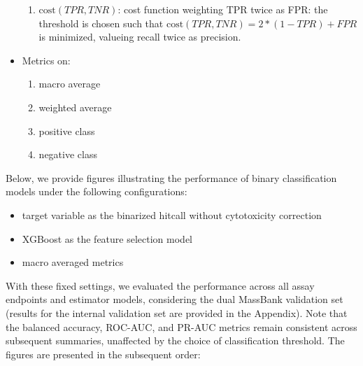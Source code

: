 \begin{itemize}
\begin{enumerate}
      \item $\text{cost}(TPR, TNR)$: cost function weighting TPR twice as FPR: the threshold is chosen such that $\text{cost}(TPR, TNR) = 2 * (1 - TPR) + FPR$ is minimized, valueing recall twice as precision.
    \end{enumerate}
  \item Metrics on:
    \begin{enumerate}
      \item macro average
      \item weighted average
      \item positive class
      \item negative class
    \end{enumerate}
\end{itemize}


Below, we provide figures illustrating the performance of binary classification models under the following configurations:
\begin{itemize}
  \item target variable as the binarized hitcall without cytotoxicity correction
  \item XGBoost as the feature selection model
  \item macro averaged metrics
\end{itemize}

With these fixed settings, we evaluated the performance across all assay endpoints and estimator models, considering the dual MassBank validation set (results for the internal validation set are provided in the Appendix). Note that the balanced accuracy, ROC-AUC, and PR-AUC metrics remain consistent across subsequent summaries, unaffected by the choice of classification threshold. The figures are presented in the subsequent order:

